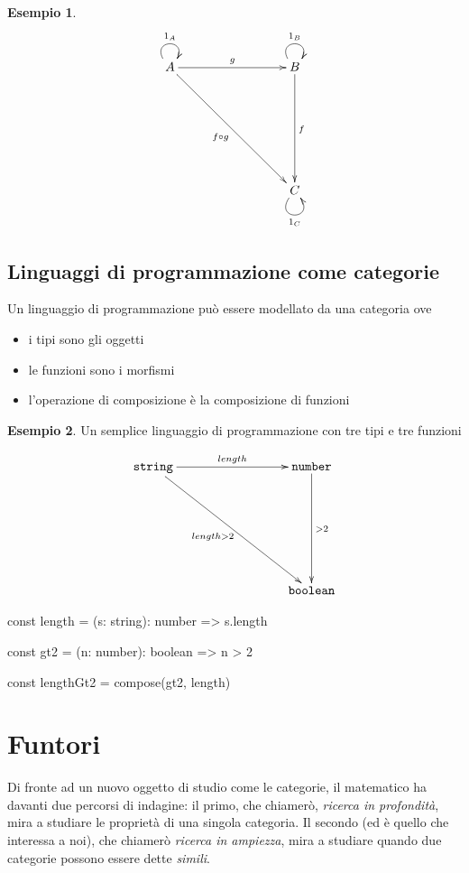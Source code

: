 \documentclass[12pt]{article}
\theoremstyle{definition}
\newtheorem{example}{Esempio}[section]
\newenvironment{code}
  {\vspace{0.5cm} \VerbatimEnvironment\begin{typescriptcode}}
  {\end{typescriptcode} \vspace{0.2cm}}
\begin{document}
\begin{example}
\[
\xymatrixrowsep{3cm}
\xymatrixcolsep{3cm}
\xymatrix{
  A \ar@(ul,ur)^{1_A} \ar[r]^g \ar[rd]_{f \circ g} & B \ar@(ul,ur)^{1_B} \ar[d]^f \\
    & C \ar@(dl,dr)_{1_C}
}
\]
\end{example}

\subsection{Linguaggi di programmazione come categorie}

Un linguaggio di programmazione può essere modellato da una categoria ove

\begin{itemize}
\item i tipi sono gli oggetti
\item le funzioni sono i morfismi
\item l'operazione di composizione è la composizione di funzioni
\end{itemize}

\begin{example}
Un semplice linguaggio di programmazione con tre tipi e tre funzioni

\[
\xymatrixrowsep{3cm}
\xymatrixcolsep{3cm}
\xymatrix{
  {\texttt{string}} \ar[r]^{length} \ar[rd]_{length > 2} & {\texttt{number}} \ar[d]^{> 2} \\
    & {\texttt{boolean}}
}
\]
\end{example}

\begin{code}
const length = (s: string): number => s.length

const gt2 = (n: number): boolean => n > 2

const lengthGt2 = compose(gt2, length)
\end{code}

\newpage

\section{Funtori}

Di fronte ad un nuovo oggetto di studio come le categorie, il matematico ha davanti due percorsi di indagine: il primo, che chiamerò, \emph{ricerca in profondità},
mira a studiare le proprietà di una singola categoria. Il secondo (ed è quello che interessa a noi), che chiamerò \emph{ricerca in ampiezza},
mira a studiare quando due categorie possono essere dette \emph{simili}.
\end{document}

